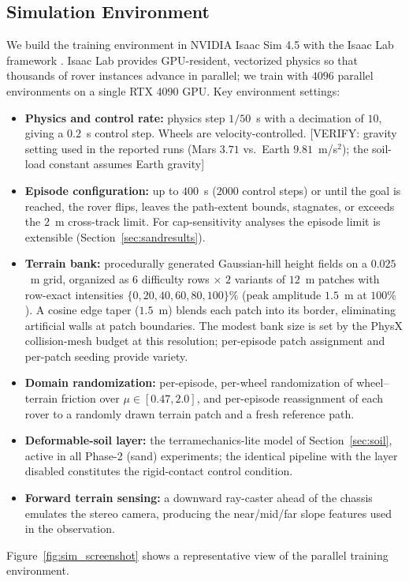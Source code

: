 \documentclass[conference]{IEEEtran}
\newcommand{\verify}[1]{\textcolor{BrickRed}{[VERIFY: #1]}}
\begin{document}
\subsection{Simulation Environment}
We build the training environment in NVIDIA Isaac Sim 4.5 with the Isaac Lab framework \cite{mittal2023orbit, makoviychuk2021isaac}. Isaac Lab provides GPU-resident, vectorized physics so that thousands of rover instances advance in parallel; we train with $4096$ parallel environments on a single RTX 4090 GPU. Key environment settings:
\begin{itemize}
\item \textbf{Physics and control rate:} physics step $1/50$~s with a decimation of $10$, giving a $0.2$~s control step. Wheels are velocity-controlled. \verify{gravity setting used in the reported runs (Mars $3.71$ vs.\ Earth $9.81$~m/s$^2$); the soil-load constant assumes Earth gravity}
\item \textbf{Episode configuration:} up to $400$~s ($2000$ control steps) or until the goal is reached, the rover flips, leaves the path-extent bounds, stagnates, or exceeds the $2$~m cross-track limit. For cap-sensitivity analyses the episode limit is extensible (Section~\ref{sec:sandresults}).
\item \textbf{Terrain bank:} procedurally generated Gaussian-hill height fields on a $0.025$~m grid, organized as $6$ difficulty rows $\times$ $2$ variants of $12$~m patches with row-exact intensities $\{0, 20, 40, 60, 80, 100\}\%$ (peak amplitude $1.5$~m at $100\%$). A cosine edge taper ($1.5$~m) blends each patch into its border, eliminating artificial walls at patch boundaries. The modest bank size is set by the PhysX collision-mesh budget at this resolution; per-episode patch assignment and per-patch seeding provide variety.
\item \textbf{Domain randomization:} per-episode, per-wheel randomization of wheel--terrain friction over $\mu \in [0.47, 2.0]$, and per-episode reassignment of each rover to a randomly drawn terrain patch and a fresh reference path.
\item \textbf{Deformable-soil layer:} the terramechanics-lite model of Section~\ref{sec:soil}, active in all Phase-2 (sand) experiments; the identical pipeline with the layer disabled constitutes the rigid-contact control condition.
\item \textbf{Forward terrain sensing:} a downward ray-caster ahead of the chassis emulates the stereo camera, producing the near/mid/far slope features used in the observation.
\end{itemize}
Figure~\ref{fig:sim_screenshot} shows a representative view of the parallel training environment.
\end{document}
